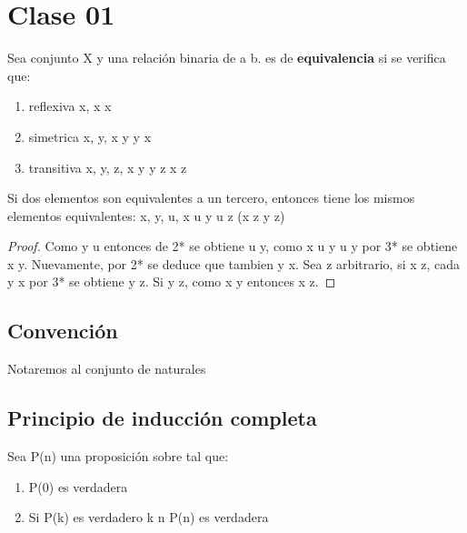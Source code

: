 \section{Clase 01}

\begin{definition}
Sea conjunto X y \relacion una relaci\'on binaria de a \relacion b. \relacion es 
de \textbf{equivalencia} si se verifica que:

\begin{enumerate}
\item reflexiva \cforall x, x \relacion x
\item simetrica \cforall x, y, x \relacion y \then y \relacion x
\item transitiva \cforall x, y, z, x \relacion y y \relacion z \then x
\relacion z
\end{enumerate}

\end{definition}

\begin{theorem}
Si dos elementos son equivalentes a un tercero, entonces tiene los mismos 
elementos equivalentes:
\hfill \break
\cforall x, y, \cexists u, x \relacion u \cland y \relacion u \then \cforall z
(x \relacion z \ciff y \relacion z)
\end{theorem}

\begin{proof}
Como y \relacion u entonces de 2*  se obtiene u \relacion y, como x \relacion u
y u \relacion y por 3* se obtiene x \relacion y. Nuevamente, por 2* se deduce
que tambien y \relacion x.
\hfill \break
Sea z arbitrario, si x \relacion z, cada y \relacion x por 3* se obtiene y
\relacion z. Si y \relacion z, como x \relacion y entonces x \relacion z. 
\end{proof}

\subsection{Convenci\'on} 

Notaremos \cN al conjunto de naturales  
 
\subsection{Principio de inducci\'on completa}
 
Sea P(n) una proposici\'on sobre \cN tal que: 

\begin{enumerate}
  \item P(0) es verdadera
  \item Si P(k) es verdadero \cforall k \< n \then P(n) es verdadera  
\end{enumerate} 


